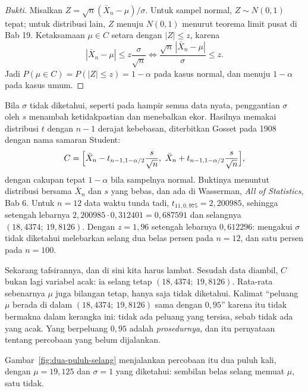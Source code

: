 \begin{proof}[Bukti]
Misalkan $Z=\sqrt n(\bar X_n-\mu)/\sigma$. Untuk sampel normal, $Z\sim N(0,1)$ tepat;
untuk distribusi lain, $Z$ menuju $N(0,1)$ menurut teorema limit pusat di Bab 19.
Ketaksamaan $\mu\in C$ setara dengan $|Z|\le z$, karena
\[
|\bar X_n-\mu|\le z\frac{\sigma}{\sqrt n}
\iff \frac{\sqrt n\,|\bar X_n-\mu|}{\sigma}\le z .
\]
Jadi $P(\mu\in C)=P(|Z|\le z)=1-\alpha$ pada kasus normal, dan menuju $1-\alpha$
pada kasus umum.
\end{proof}

Bila $\sigma$ tidak diketahui, seperti pada hampir semua data nyata, penggantian
$\sigma$ oleh $s$ menambah ketidakpastian dan menebalkan ekor. Hasilnya memakai
distribusi $t$ dengan $n-1$ derajat kebebasan, diterbitkan Gosset pada 1908 dengan nama
samaran Student:
\[
C=\Bigl[\bar X_n-t_{n-1,1-\alpha/2}\frac{s}{\sqrt n},\
\bar X_n+t_{n-1,1-\alpha/2}\frac{s}{\sqrt n}\Bigr],
\]
dengan cakupan tepat $1-\alpha$ bila sampelnya normal. Buktinya menuntut distribusi
bersama $\bar X_n$ dan $s$ yang bebas, dan ada di Wasserman, \emph{All of Statistics},
Bab 6. Untuk $n=12$ data waktu tunda tadi, $t_{11,0{,}975}=2{,}200985$, sehingga
setengah lebarnya $2{,}200985\cdot0{,}312401=0{,}687591$ dan selangnya
$(18{,}4374;\ 19{,}8126)$. Dengan $z=1{,}96$ setengah lebarnya $0{,}612296$: mengakui
$\sigma$ tidak diketahui melebarkan selang dua belas persen pada $n=12$, dan satu
persen pada $n=100$.

Sekarang tafsirannya, dan di sini kita harus lambat. Sesudah data diambil,
$C$ bukan lagi variabel acak: ia selang tetap $(18{,}4374;\ 19{,}8126)$. Rata-rata
sebenarnya $\mu$ juga bilangan tetap, hanya saja tidak diketahui. Kalimat
``peluang $\mu$ berada di dalam $(18{,}4374;\ 19{,}8126)$ sama dengan $0{,}95$''
karena itu tidak bermakna dalam kerangka ini: tidak ada peluang yang tersisa, sebab
tidak ada yang acak. Yang berpeluang $0{,}95$ adalah \emph{prosedurnya}, dan itu
pernyataan tentang percobaan yang belum dijalankan.

Gambar~\ref{fig:dua-puluh-selang} menjalankan percobaan itu dua puluh kali, dengan
$\mu=19{,}125$ dan $\sigma=1$ yang diketahui: sembilan belas selang memuat $\mu$, satu
tidak.

